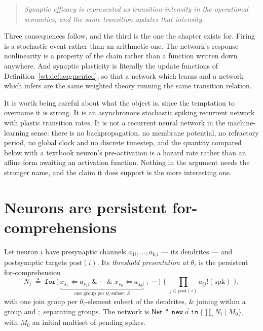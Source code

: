 \begin{quote}
\emph{Synaptic efficacy is represented as transition intensity in the operational
semantics, and the same transition updates that intensity.}
\end{quote}

Three consequences follow, and the third is the one the chapter exists for. Firing is a
stochastic event rather than an arithmetic one. The network's response nonlinearity is a
property of the chain rather than a function written down anywhere. And synaptic
plasticity is literally the update functions of Definition~\ref{wt:def:augmented}, so
that a network which learns and a network which infers are the same weighted theory
running the same transition relation.

It is worth being careful about what the object is, since the temptation to overname it
is strong. It is an asynchronous stochastic spiking recurrent network with plastic
transition rates. It is not a recurrent neural network in the machine-learning sense:
there is no backpropagation, no membrane potential, no refractory period, no global clock
and no discrete timestep, and the quantity compared below with a textbook neuron's
pre-activation is a hazard rate rather than an affine form awaiting an activation
function. Nothing in the argument needs the stronger name, and the claim it does support
is the more interesting one.

\section{Neurons are persistent for-comprehensions}

\begin{definition}[Neuron]
\label{spk:def:neuron}
Let neuron $i$ have presynaptic channels $a_{1i}, \ldots, a_{k_i i}$ --- its dendrites ---
and postsynaptic targets $\mathrm{post}(i)$. Its \emph{threshold presentation at
$\theta_i$} is the persistent for-comprehension
\[
  N_i \;\triangleq\;
  \texttt{for}\bigl(\,
    \underbrace{x_{s_1} \Leftarrow a_{s_1 i} \;\&\; \cdots \;\&\; x_{s_\theta} \Leftarrow a_{s_\theta i}}
    _{\text{one group per }\theta_i\text{-subset } S}
  \;;\; \cdots \,\bigr)
  \;\bigl\{\; \textstyle\prod_{j \in \mathrm{post}(i)} a_{ij}!(\mathrm{spk}) \;\bigr\},
\]
with one join group per $\theta_i$-element subset of the dendrites, $\&$ joining within a
group and $;$ separating groups. The network is
$\mathsf{Net} \triangleq \texttt{new}\ \vec{a}\ \texttt{in}\ \{\prod_i N_i \mid M_0\}$,
with $M_0$ an initial multiset of pending spikes.
\end{definition}

